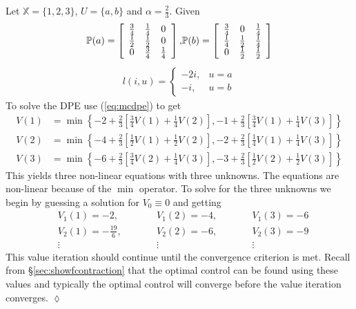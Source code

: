 \begin{example}
\label{ex:valit}
Let $\mathbb{X}=\{1,2,3\}$, $U=\{a,b\}$ and $\alpha=\frac{2}{3}$. Given
\begin{align*}
\begin{split}
\mathbb{P}(a) = \left[\begin{array}{c c c} \frac{3}{4} & \frac{1}{4} & 0 \\ \frac{1}{2} & \frac{1}{2} & 0 \\ 0 & \frac{3}{4} & \frac{1}{4} \end{array}\right],
\end{split}
\begin{split}
\mathbb{P}(b) = \left[\begin{array}{c c c} \frac{3}{4} & 0 & \frac{1}{4} \\ \frac{1}{4} & \frac{1}{2} & \frac{1}{4} \\ 0 & \frac{1}{2} & \frac{1}{2} \end{array}\right]
\end{split}
\end{align*}
\begin{align*}
l(i,u) = \begin{cases} -2i, & u=a \\ -i, & u=b \end{cases}
\end{align*}
To solve the DPE use (\ref{eq:mcdpe}) to get
\begin{align*}
V(1) &= \min\left\lbrace-2+\frac{2}{3}\left[\frac{3}{4}V(1)+\frac{1}{4}V(2)\right], -1+\frac{2}{3}\left[\frac{3}{4}V(1)+\frac{1}{4}V(3)\right]\right\rbrace \\
V(2) &= \min\left\lbrace-4+\frac{2}{3}\left[\frac{1}{2}V(1)+\frac{1}{2}V(2)\right], -2+\frac{2}{3}\left[\frac{1}{4}V(1)+\frac{1}{4}V(3)\right]\right\rbrace \\
V(3) &= \min\left\lbrace-6+\frac{2}{3}\left[\frac{3}{4}V(2)+\frac{1}{4}V(3)\right], -3+\frac{2}{3}\left[\frac{1}{2}V(2)+\frac{1}{2}V(3)\right]\right\rbrace
\end{align*}
This yields three non-linear equations with three unknowns. The equations are non-linear because of the $\min$ operator. To solve for the three unknowns we begin by guessing a solution for $V_0\equiv0$ and getting
\begin{align*}
&V_1(1) = -2, &\qquad &V_1(2) = -4, &\qquad &V_1(3) = -6 \\
&V_2(1) = -\frac{19}{6}, &\qquad &V_2(2) = -6, &\qquad &V_2(3) = -9 \\
&\vdots &\qquad & \vdots &\qquad &\vdots
\end{align*}
This value iteration should continue until the convergence criterion is met. Recall from \S\ref{sec:showfcontraction} that the optimal control can be found using these values and typically the optimal control will converge before the value iteration converges.
$\lozenge$
\end{example}

